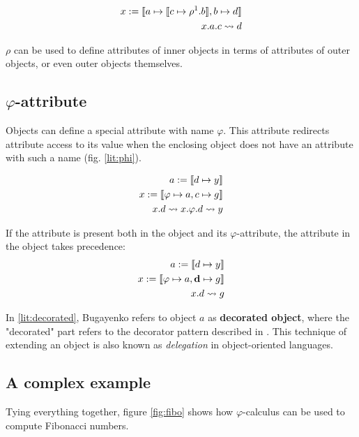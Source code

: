 \begin{align}
    \label{lit:complex}
    x := \llbracket a \mapsto \llbracket c \mapsto \rho^1.b \rrbracket, b \mapsto d \rrbracket \\
    x.a.c \rightsquigarrow d
\end{align}

$\rho$ can be used to define attributes of inner objects in terms of attributes of outer objects, or even outer objects themselves.

\subsection{$\varphi$-attribute}
Objects can define a special attribute with name $\varphi$. This attribute redirects attribute access to its value when the enclosing object does not have an attribute with such a name (fig. \ref{lit:phi}).

\begin{align}
    \label{lit:phi}
    a := \llbracket d \mapsto y \rrbracket                    \\
    \label{lit:decorated}
    x := \llbracket \varphi \mapsto a, c \mapsto g \rrbracket \\
    x.d \rightsquigarrow x.\varphi.d \rightsquigarrow y
\end{align}

If the attribute is present both in the object and its $\varphi$-attribute, the attribute in the object takes precedence:
\begin{align*}
    a := \llbracket d \mapsto y \rrbracket                             \\
    x := \llbracket \varphi \mapsto a, \textbf{d} \mapsto g \rrbracket \\
    x.d \rightsquigarrow g
\end{align*}

In \ref{lit:decorated}, Bugayenko \cite{eolang} refers to object $a$ as \textbf{decorated object}, where the "decorated" part refers to the decorator pattern described in \cite[Chapter 4]{GOFPatterns}. This technique of extending an object is also known as \textit{delegation} \cite{raiha_delegation:_1994} in object-oriented languages.

\subsection{A complex example}
Tying everything together, figure \ref{fig:fibo} shows how $\varphi$-calculus can be used to compute Fibonacci numbers.

